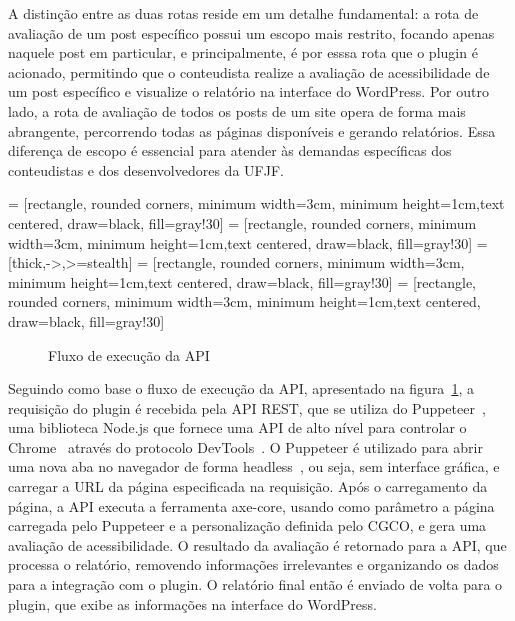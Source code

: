 \documentclass[
	article,			%
	12pt,				%
	oneside,			%
	a4paper,			%
	section=TITLE,		%
	subsection=TITLE,	%
	english,			%
	brazil,				%
	sumario=tradicional
	]{abntex2}
\begin{document}
A distinção entre as duas rotas reside em um detalhe fundamental: a rota
de avaliação de um post específico possui um escopo mais restrito, focando
apenas naquele post em particular, e principalmente, é por esssa rota que
o plugin é acionado, permitindo que o conteudista realize a avaliação de
acessibilidade de um post específico e visualize o relatório na interface do
WordPress. Por outro lado, a rota de avaliação de todos os posts de um site
opera de forma mais abrangente, percorrendo todas as páginas disponíveis
e gerando relatórios. Essa diferença de escopo é essencial para atender às
demandas específicas dos conteudistas e dos desenvolvedores da UFJF.
\bigbreak

 = [rectangle, rounded corners, minimum width=3cm,
minimum height=1cm,text centered, draw=black, fill=gray!30]
 = [rectangle, rounded corners, minimum width=3cm,
minimum height=1cm,text centered, draw=black, fill=gray!30]
 = [thick,->,>=stealth]
 = [rectangle, rounded corners, minimum width=3cm,
minimum height=1cm,text centered, draw=black, fill=gray!30]
 = [rectangle, rounded corners, minimum width=3cm,
minimum height=1cm,text centered, draw=black, fill=gray!30]
\begin{figure}[h]
    \centering
    \caption{Fluxo de execução da API}
    \label{fig:fluxo}
\end{figure}

Seguindo como base o fluxo de execução da API, apresentado na figura~\ref{fig:fluxo},
a requisição do plugin é recebida pela API REST, que se utiliza
do Puppeteer~\cite{puppeteer}, uma biblioteca Node.js que fornece uma
API de alto nível para controlar o Chrome~\cite{chrome} através do protocolo
DevTools~\cite{devtools}. O Puppeteer é utilizado para abrir uma nova aba no navegador de forma
headless~\cite{headless}, ou seja, sem interface gráfica, e carregar a URL da página
especificada na requisição. Após o carregamento da página, a API
executa a ferramenta axe-core, usando como parâmetro a página carregada
pelo Puppeteer e a personalização definida pelo CGCO, e gera uma avaliação
de acessibilidade. O resultado da avaliação é retornado para a API, que
processa o relatório, removendo informações irrelevantes e organizando os dados
para a integração com o plugin. O relatório final então é enviado de
volta para o plugin, que exibe as informações na interface do WordPress.
\end{document}
